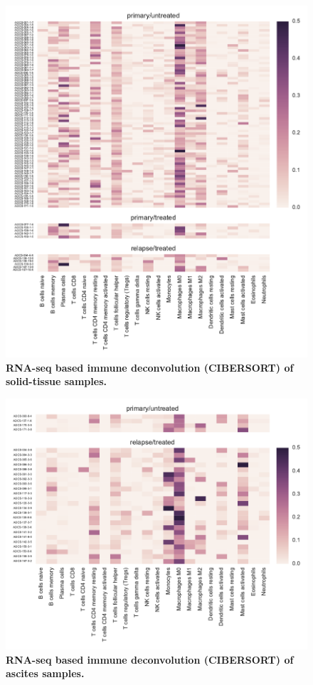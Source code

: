 \documentclass{article}
\begin{document}
\begin{figure}[htbp]
\centering
\includegraphics[scale=1.0]{../figures/cibersort_heatmap_solid.pdf}
\caption{\textbf{RNA-seq based immune deconvolution (CIBERSORT) of solid-tissue samples.}}
\label{fig:cibersortsolid}
\end{figure}

\begin{figure}[htbp]
\centering
\includegraphics[scale=1.0]{../figures/cibersort_heatmap_ascites.pdf}
\caption{\textbf{RNA-seq based immune deconvolution (CIBERSORT) of ascites samples.}}
\label{fig:cibersortascites}
\end{figure}
\end{document}
